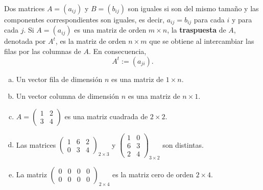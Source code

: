 Dos matrices $A=(a_{ij})$ y $B=(b_{ij})$ son iguales si son del mismo tamaño y las componentes correspondientes son iguales, es decir, $a_{ij}=b_{ij}$ para cada $i$ y para cada $j$.
Si $A = (a_{i j})$ es una matriz de orden $m \times n$, la \textbf{traspuesta} de $A$, denotada por $A^t$,
es la matriz de orden $n \times m$ que se obtiene al intercambiar las filas por las columnas
de $A$. En consecuencia, 
\[A^t := (a_{j i }).\]

\begin{ejem}
\begin{enumerate}[(a)]
    \item Un vector fila de dimensi\'on $n$ es una matriz de $1\times n$.
    \item Un vector columna de dimensi\'on $n$ es una matriz de $n\times 1$.
    \item $A=\left(\begin{array}{cc}{} 1 & 2\\ 3 & 4 \end{array}\right)$ es una matriz cuadrada de $2\times 2$.
    \item Las matrices $\begin{pmatrix}1& 6& 2 \\0&3&4\end{pmatrix}_{2\times 3}$ y $\left(\begin{array}{cc}
   1& 0 \\
    6&3\\
    2& 4
\end{array}\right)_{3\times 2}$ son distintas.
    \item La matriz $\begin{pmatrix}
   0& 0& 0& 0 \\
   0&0&0& 0
\end{pmatrix}_{2\times 4}$ es la matriz cero de orden $2\times 4$.
\end{enumerate}
\end{ejem}

